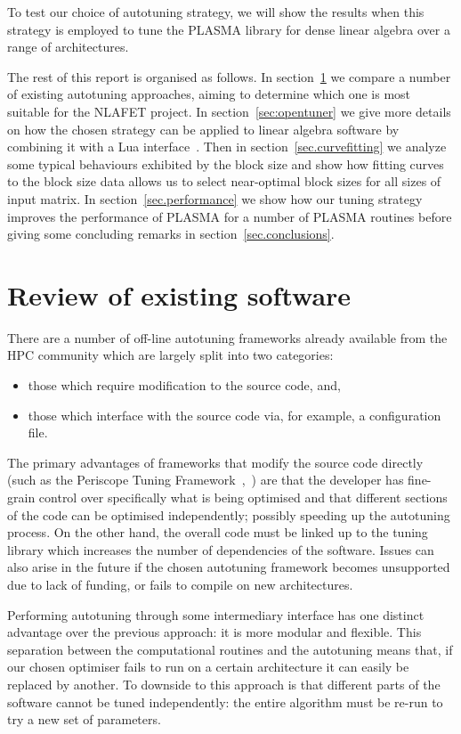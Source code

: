 \documentclass[a4paper,12pt]{article}
\begin{document}
To test our choice of autotuning strategy,
we will show the results when this strategy is employed to tune
the PLASMA library for dense linear algebra over a range of architectures.

The rest of this report is organised as follows.
In section~\ref{sec.review} we compare a number of existing
autotuning approaches,
aiming to determine which one is most suitable
for the NLAFET project.
In section~\ref{sec:opentuner} we give more details
on how the chosen strategy can be applied to linear algebra software
by combining it with a Lua interface~\cite{ierusalimschy2006lua}.
Then in section~\ref{sec.curvefitting} we analyze some typical
behaviours exhibited by the block size and show how fitting curves
to the block size data allows us to select near-optimal block sizes
for all sizes of input matrix.
In section~\ref{sec.performance} we show how our
tuning strategy improves the performance of PLASMA for
a number of PLASMA routines before giving some concluding remarks in
section~\ref{sec.conclusions}.

\section{Review of existing software}
\label{sec.review}
There are a number of off-line autotuning frameworks already
available from the HPC community
which are largely split into two categories:
\begin{itemize}
\item those which require modification to the source code, and,
\item those which interface with the source code via, for example,
  a configuration file.
\end{itemize}

The primary advantages of frameworks that modify the
source code directly
(such as the
Periscope Tuning Framework~\cite{mice13},~\cite{ptf14})
are that the developer has fine-grain control over specifically what
is being optimised and that different sections of the code can be
optimised independently;
possibly speeding up the autotuning process.
On the other hand,
the overall code must be linked up to the tuning library which
increases the number of dependencies of the software.
Issues can also arise in the future if the chosen
autotuning framework becomes unsupported due to lack of funding,
or fails to compile on new architectures.

Performing autotuning through some intermediary interface
has one distinct advantage over the previous approach:
it is more modular and flexible.
This separation between the computational routines and the
autotuning means that,
if our chosen optimiser fails to run on a certain architecture
it can easily be replaced by another.
To downside to this approach is that different parts of the software
cannot be tuned independently:
the entire algorithm must be re-run to try a new set of parameters.
\end{document}
